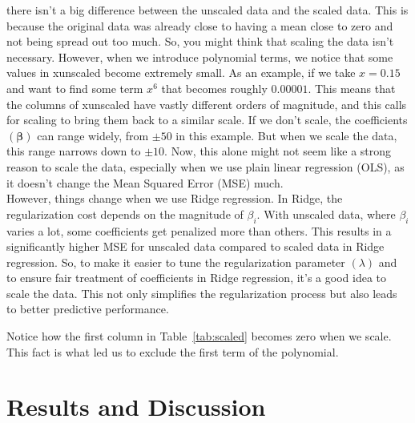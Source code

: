 \documentclass[twoside,11pt]{report}
\begin{document}
there isn't a big difference between the unscaled data and the scaled data. 
This is because the original data was already close to having a mean close to zero and not being spread out too much. 
So, you might think that scaling the data isn't necessary.
However, when we introduce polynomial terms, we notice that some values in xunscaled become extremely small. As an example, 
if we take $x=0.15$ and want to find some term $x^6$ that becomes roughly $0.00001$. This means that the columns of xunscaled have vastly different orders of magnitude, and this calls 
for scaling to bring them back to a similar scale.
If we don't scale, the coefficients $(\boldsymbol{\beta})$ can range widely, from $\pm 50$ in this example. 
But when we scale the data, this range narrows 
down to $\pm 10$. Now, this alone might not seem like a strong reason to scale the data, especially when we use plain 
linear regression (OLS), as it doesn't change the Mean Squared Error (MSE) much.\\
However, things change when we use Ridge regression. In Ridge, the regularization cost depends on the magnitude of $\beta_i$.
With unscaled data, where $\beta_i$ varies a lot, some coefficients get penalized more than others. This results in a 
significantly higher MSE for unscaled data compared to scaled data in Ridge regression.
So, to make it easier to tune the regularization parameter $(\lambda)$ and to ensure fair treatment of coefficients in Ridge regression, 
it's a good idea to scale the data. This not only simplifies the regularization process but also leads to better predictive performance.

Notice how the first column in Table~\ref{tab:scaled} becomes zero when we scale. This fact is what led us to exclude the first term of the polynomial.









\newpage
\section{Results and Discussion}
\label{sec:resultsdiscussion}
\end{document}
